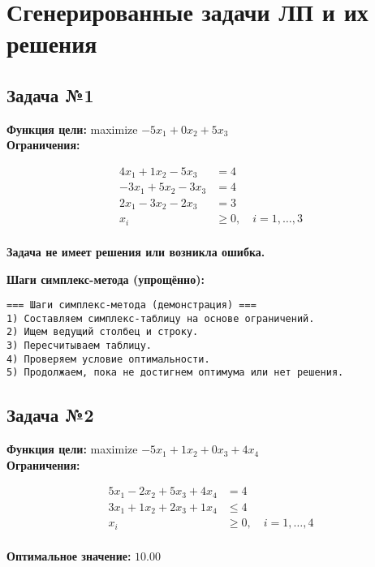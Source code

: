 \documentclass[a4paper,12pt]{article}
\begin{document}
\section*{Сгенерированные задачи ЛП и их решения}

\subsection*{Задача №1}
\textbf{Функция цели: }
maximize $ -5x_{1} +0x_{2} +5x_{3} $\\

\textbf{Ограничения:}

\[ \begin{aligned}
4x_{1} +1x_{2} -5x_{3} &= 4 \\ 
-3x_{1} +5x_{2} -3x_{3} &= 4 \\ 
2x_{1} -3x_{2} -2x_{3} &= 3 \\ 
x_i &\ge 0, \quad i=1,\dots,3 \\ 
\end{aligned}\]

\textbf{Задача не имеет решения или возникла ошибка.}

\textbf{Шаги симплекс-метода (упрощённо):}

\begin{verbatim}
=== Шаги симплекс-метода (демонстрация) ===
1) Составляем симплекс-таблицу на основе ограничений.
2) Ищем ведущий столбец и строку.
3) Пересчитываем таблицу.
4) Проверяем условие оптимальности.
5) Продолжаем, пока не достигнем оптимума или нет решения.

\end{verbatim}



\subsection*{Задача №2}
\textbf{Функция цели: }
maximize $ -5x_{1} +1x_{2} +0x_{3} +4x_{4} $\\

\textbf{Ограничения:}

\[ \begin{aligned}
5x_{1} -2x_{2} +5x_{3} +4x_{4} &= 4 \\ 
3x_{1} +1x_{2} +2x_{3} +1x_{4} &\le 4 \\ 
x_i &\ge 0, \quad i=1,\dots,4 \\ 
\end{aligned}\]

\textbf{Оптимальное значение: }$10.00$
\end{document}
